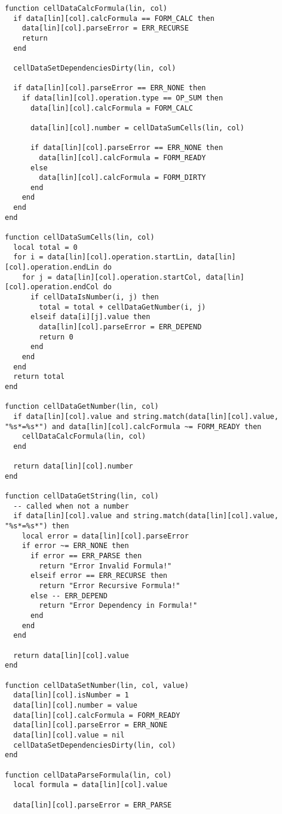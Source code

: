 \documentclass{ctexart}
\begin{document}
\begin{lstlisting}
function cellDataCalcFormula(lin, col)
  if data[lin][col].calcFormula == FORM_CALC then
    data[lin][col].parseError = ERR_RECURSE
    return
  end

  cellDataSetDependenciesDirty(lin, col)

  if data[lin][col].parseError == ERR_NONE then
    if data[lin][col].operation.type == OP_SUM then
      data[lin][col].calcFormula = FORM_CALC

      data[lin][col].number = cellDataSumCells(lin, col)

      if data[lin][col].parseError == ERR_NONE then
        data[lin][col].calcFormula = FORM_READY
      else
        data[lin][col].calcFormula = FORM_DIRTY
      end
    end
  end
end

function cellDataSumCells(lin, col)
  local total = 0
  for i = data[lin][col].operation.startLin, data[lin][col].operation.endLin do
    for j = data[lin][col].operation.startCol, data[lin][col].operation.endCol do
      if cellDataIsNumber(i, j) then
        total = total + cellDataGetNumber(i, j)
      elseif data[i][j].value then
        data[lin][col].parseError = ERR_DEPEND
        return 0
      end
    end
  end
  return total
end

function cellDataGetNumber(lin, col)
  if data[lin][col].value and string.match(data[lin][col].value, "%s*=%s*") and data[lin][col].calcFormula ~= FORM_READY then
    cellDataCalcFormula(lin, col)
  end

  return data[lin][col].number
end

function cellDataGetString(lin, col)
  -- called when not a number
  if data[lin][col].value and string.match(data[lin][col].value, "%s*=%s*") then
    local error = data[lin][col].parseError
    if error ~= ERR_NONE then
      if error == ERR_PARSE then
        return "Error Invalid Formula!"
      elseif error == ERR_RECURSE then
        return "Error Recursive Formula!"
      else -- ERR_DEPEND
        return "Error Dependency in Formula!"
      end
    end
  end

  return data[lin][col].value
end

function cellDataSetNumber(lin, col, value)
  data[lin][col].isNumber = 1
  data[lin][col].number = value
  data[lin][col].calcFormula = FORM_READY
  data[lin][col].parseError = ERR_NONE
  data[lin][col].value = nil
  cellDataSetDependenciesDirty(lin, col)
end

function cellDataParseFormula(lin, col)
  local formula = data[lin][col].value

  data[lin][col].parseError = ERR_PARSE


\end{lstlisting}
\end{document}

